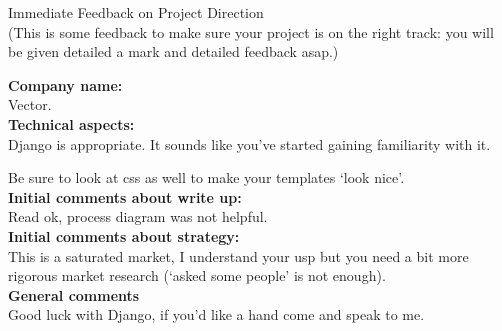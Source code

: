 \documentclass{article}
\begin{document}
\begin{center}
\Huge{Immediate Feedback on Project Direction}\\
\tiny{(This is some feedback to make sure your project is on the right track: you will be given detailed a mark and detailed feedback asap.)}
\end{center}


\normalsize
\textbf{Company name:}\\

Vector. \\

\textbf{Technical aspects:}\\

Django is appropriate. It sounds like you've started gaining familiarity with it.

Be sure to look at css as well to make your templates `look nice'.\\

\textbf{Initial comments about write up:}\\

Read ok, process diagram was not helpful.\\

\textbf{Initial comments about strategy:}\\

This is a saturated market, I understand your usp but you need a bit more rigorous market research (`asked some people' is not enough).\\

\textbf{General comments}\\

Good luck with Django, if you'd like a hand come and speak to me.\\
\end{document}
